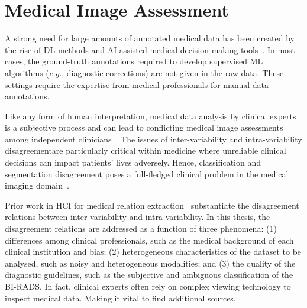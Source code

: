 \section{Medical Image Assessment}
\label{sec:sec003004}

A strong need for large amounts of annotated medical data has been created by the rise of \ac{DL} methods and \ac{AI}-assisted medical decision-making tools~\cite{10.1145/3313831.3376290}.
In most cases, the ground-truth annotations required to develop supervised \ac{ML} algorithms ({\it e.g.}, diagnostic corrections) are not given in the raw data.
These settings require the expertise from medical professionals for manual data annotations.

Like any form of human interpretation, medical data analysis by clinical experts is a subjective process and can lead to conflicting medical image assessments among independent clinicians~\cite{NIAZI2019e253, granzier2020mri, DEMCHIG201962}.
The issues of inter-variability and intra-variability disagreement\footnotemark[9] are particularly critical within medicine where unreliable clinical decisions can impact patients' lives adversely.
Hence, classification and segmentation disagreement poses a full-fledged clinical problem in the medical imaging domain~\cite{TANNO2021117366, raghu2019direct}.

Prior work in \ac{HCI} for medical relation extraction~\cite{10.1145/3152889} substantiate the disagreement relations between inter-variability and intra-variability.
In this thesis, the disagreement relations are addressed as a function of three phenomena: (1) differences among clinical professionals, such as the medical background of each clinical institution and bias; (2) heterogeneous characteristics of the dataset to be analysed, such as noisy and heterogeneous modalities; and (3) the quality of the diagnostic guidelines, such as the subjective and ambiguous classification of the \ac{BI-RADS}.
In fact, clinical experts often rely on complex viewing technology to inspect medical data.
Making it vital to find additional sources.


